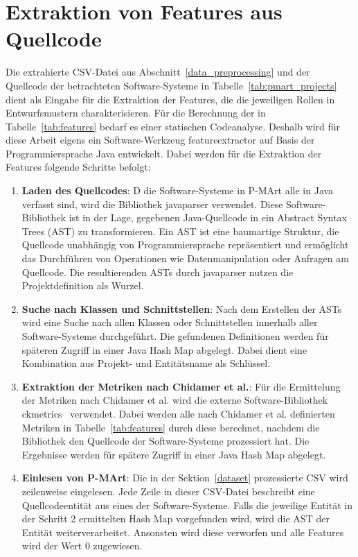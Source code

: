 \section{Extraktion von Features aus Quellcode}\label{feature_extraction}
Die extrahierte CSV-Datei aus Abschnitt~\ref{data_preprocessing} und der Quellcode der betrachteten Software-Systeme in Tabelle~\ref{tab:pmart_projects} dient als Eingabe für die Extraktion der Features, die die jeweiligen Rollen in Entwurfsmustern charakterisieren. 
Für die Berechnung der in Tabelle~\ref{tab:features} bedarf es einer statischen Codeanalyse. Deshalb wird für diese Arbeit eigens ein Software-Werkzeug featureextractor auf Basis der Programmiersprache Java entwickelt.
Dabei werden für die Extraktion der Features folgende Schritte befolgt:

\begin{enumerate}
    \item \textbf{Laden des Quellcodes}: D  die Software-Systeme in P-MArt alle in Java verfasst sind, wird die Bibliothek javaparser verwendet. Diese Software-Bibliothek ist in der Lage, gegebenen Java-Quellcode in ein Abstract Syntax Trees (AST) zu transformieren.
    Ein AST ist eine baumartige Struktur, die Quellcode unabhängig von Programmiersprache repräsentiert und ermöglicht das Durchführen von Operationen wie Datenmanipulation oder Anfragen am Quellcode. Die resultierenden ASTs durch javaparser nutzen die Projektdefinition als Wurzel. 
    \item \textbf{Suche nach Klassen und Schnittstellen}: Nach dem Erstellen der ASTs wird eine Suche nach allen Klassen oder Schnittstellen innerhalb aller Software-Systeme durchgeführt. Die gefundenen Definitionen werden für späteren Zugriff in einer Java Hash Map abgelegt.
    Dabei dient eine Kombination aus Projekt- und Entitätsname als Schlüssel. 
    \item \textbf{Extraktion der Metriken nach Chidamer et al.}: Für die Ermittelung der Metriken nach Chidamer et al. wird die externe Software-Bibliothek ckmetrics~\cite{aniche-ck} verwendet. Dabei werden alle nach Chidamer et al. definierten Metriken in Tabelle~\ref{tab:features} durch diese berechnet, nachdem die Bibliothek den Quellcode der Software-Systeme prozessiert hat. Die Ergebnisse werden für spätere Zugriff in einer Java Hash Map abgelegt.
    \item \textbf{Einlesen von P-MArt}: Die in der Sektion~\ref{dataset} prozessierte CSV wird zeilenweise eingelesen. Jede Zeile in dieser CSV-Datei beschreibt eine Quellcodeentität aus eines der Software-Systeme. Falls die jeweilige Entität in der Schritt 2 ermittelten Hash Map vorgefunden wird, wird die AST der Entität weiterverarbeitet. Ansonsten wird diese verworfen und alle Features wird der Wert 0 zugewiesen.

\end{enumerate}
